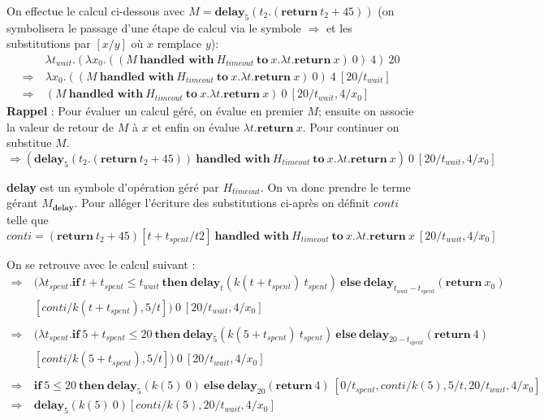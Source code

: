 	\begin{exemple}
		On effectue le calcul ci-dessous avec $M = \textbf{delay}_5(t_2.(\textbf{return}~t_2 + 45))$ (on symbolisera le passage d'une étape de calcul via le symbole $\Rightarrow$ et les substitutions par $[x/y]$ où $x$ remplace $y$):
		\begin{align*}
			&~\lambda t_{wait}.(\lambda x_0.((M~\textbf{handled~with}~H_{timeout}~\textbf{to}~x.\lambda t.\textbf{return}~x)~0)~4)~20\\
			\Rightarrow &~\lambda x_0.((M~\textbf{handled~with}~H_{timeout}~\textbf{to}~x.\lambda t.\textbf{return}~x)~0)~4~[20/t_{wait}]\\
			\Rightarrow &~(M~\textbf{handled~with}~H_{timeout}~\textbf{to}~x.\lambda t.\textbf{return}~x)~0~[20/t_{wait},4/x_0]
		\end{align*}
		\bigbreak
		\textbf{Rappel} : Pour évaluer un calcul géré, on évalue en premier $M$; ensuite on associe la valeur de retour de $M$ à $x$ et enfin on évalue $\lambda t.\textbf{return}~x$.
		\bigbreak
		Pour continuer on substitue $M$.
		\[\Rightarrow (\textbf{delay}_5(t_2.(\textbf{return}~t_2 + 45))~\textbf{handled~with}~H_{timeout}~\textbf{to}~x.\lambda t.\textbf{return}~x)~0~[20/t_{wait},4/x_0]\]
	
		\textbf{delay} est un symbole d'opération géré par $H_{timeout}$. On va donc prendre le terme gérant $M_\textbf{delay}$. Pour alléger l'écriture des substitutions ci-après on définit $conti$ telle que 
		\[conti = (\textbf{return}~t_2 + 45)[t + t_{spent}/t2]~\textbf{handled~with}~H_{timeout}~\textbf{to}~x.\lambda t.\textbf{return}~x~[20/t_{wait},4/x_0]\]
		
		
		On se retrouve avec le calcul suivant :
		\begin{align*}
			\Rightarrow &~\textbf{(}\lambda t_{spent}.\textbf{if}~t+t_{spent} \leq t_{wait}~\textbf{then}~\textbf{delay}_t(k(t+t_{spent})~t_{spent})~\textbf{else}~\textbf{delay}_{t_{wait} - t_{spent}}(\textbf{return}~x_0)\\
			&~[conti/k(t + t_{spent}),5/t]\textbf{)}~0~[20/t_{wait},4/x_0]\\\\
			\Rightarrow &~\textbf{(}\lambda t_{spent}.\textbf{if}~5+t_{spent} \leq 20~\textbf{then}~\textbf{delay}_5(k(5+t_{spent})~t_{spent})~\textbf{else}~\textbf{delay}_{20 - t_{spent}}(\textbf{return}~4)\\
			&~[conti/k(5 + t_{spent}),5/t]\textbf{)}~0~[20/t_{wait},4/x_0]\\\\
			\Rightarrow &~\textbf{if}~5 \leq 20~\textbf{then}~\textbf{delay}_5(k(5)~0)~\textbf{else}~\textbf{delay}_{20}(\textbf{return}~4)~[0/t_{spent},conti/k(5),5/t,20/t_{wait},4/x_0]\\
			\Rightarrow &~\textbf{delay}_5(k(5)~0) [conti/k(5),20/t_{wait},4/x_0]
		\end{align*}
		\bigbreak
		

\end{exemple}
